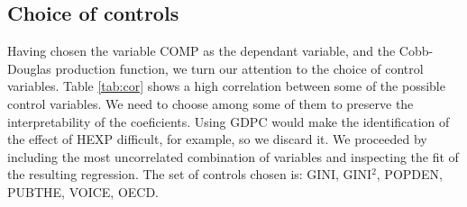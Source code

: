 \documentclass[12pt,a4paper]{article}\usepackage[]{graphicx}\usepackage[]{color}
\begin{document}
\subsection{Choice of controls}
Having chosen the variable COMP as the dependant variable, and the Cobb-Douglas production function, we turn our attention to the choice of control variables. Table \ref{tab:cor} shows a high correlation between some of the possible control variables. We need to choose among some of them to preserve the interpretability of the coeficients. Using GDPC would make the identification of the effect of HEXP difficult, for example, so we discard it. We proceeded by including the most uncorrelated combination of variables and inspecting the fit of the resulting regression. The set of controls chosen is: GINI, GINI$^2$, POPDEN, PUBTHE, VOICE, OECD.
\end{document}
